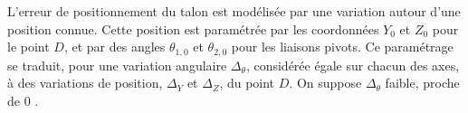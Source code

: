 \ifprof
\else
L'erreur de positionnement du talon est modélisée par une variation autour d'une position connue. Cette position est paramétrée par les coordonnées $Y_{0}$ et $Z_{0}$ pour le point $D$, et par des angles $\theta_{1,0}$ et $\theta_{2,0}$ pour les liaisons pivots. Ce paramétrage se traduit, pour une variation angulaire $\Delta_{\theta}$, considérée égale sur chacun des axes, à des variations de position, $\Delta_{Y}$ et $\Delta_{Z}$, du point $D$. On suppose $\Delta_{\theta}$ faible, proche de 0 .
\fi
\ifprof

